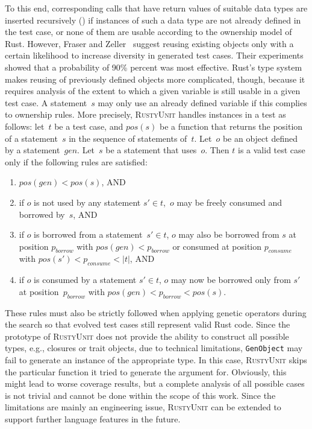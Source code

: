 \documentclass[paper=a4,%
  twoside,%
  BCOR4mm,%
  abstract=true,%
  toc=bibliography,%
  chapterprefix=true,%
  toc=bibliographynumbered,%
  open=right,%
  english,%
  pagesize=pdftex]{scrreprt}
\newcommand{\tech}{\textsc{RustyUnit}\xspace}
\begin{document}
To this end, corresponding calls that have return values of suitable data types are inserted recursively () if instances of such a data type are not already defined in the test case, or none of them are usable according to the ownership model of Rust. However, Fraser and Zeller~\cite{Fraser2012} suggest reusing existing objects only with a certain likelihood to increase diversity in generated test cases. Their experiments showed that a probability of 90\% percent was most effective. Rust's type system makes reusing of previously defined objects more complicated, though, because it requires analysis of the extent to which a given variable is still usable in a given test case. A statement~$s$ may only use an already defined variable if this complies to ownership rules. More precisely, \tech handles instances in a test as follows: let~$t$ be a test case, and $pos(s)$ be a function that returns the position of a statement~$s$ in the sequence of statements of~$t$. Let~$o$ be an object defined by a statement~$gen$. Let~$s$ be a statement that uses~$o$. Then $t$ is a valid test case only if the following rules are satisfied:
\begin{enumerate}
    \item $pos(gen) < pos(s)$, AND
    \item if $o$ is not used by any statement $s' \in t$,~$o$ may be freely consumed and borrowed by~$s$, AND
    \item if $o$ is borrowed from a statement~$s' \in t$, $o$ may also be borrowed from $s$ at position $p_{borrow}$ with $pos(gen) < p_{borrow}$ or consumed at position $p_{consume}$ with $pos(s') < p_{consume} < \left|t\right|$, AND
    \item if $o$ is consumed by a statement $s' \in t$, $o$ may now be borrowed only from $s'$ at position~$p_{borrow}$ with $pos(gen) < p_{borrow} < pos(s)$.
\end{enumerate}

These rules must also be strictly followed when applying genetic operators during the search so that evolved test cases still represent valid Rust code. Since the prototype of \tech does not provide the ability to construct all possible types, e.g., closures or trait objects, due to technical limitations, \texttt{GenObject} may fail to generate an instance of the appropriate type. In this case, \tech skips the particular function it tried to generate the argument for. Obviously, this might lead to worse coverage results, but a complete analysis of all possible cases is not trivial and cannot be done within the scope of this work. Since the limitations are mainly an engineering issue, \tech can be extended to support further language features in the future.
\end{document}
